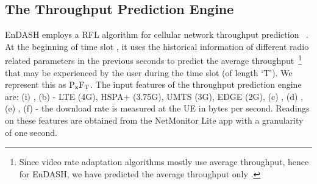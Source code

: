  \subsection{The Throughput Prediction Engine}\label{section:thpre}
EnDASH employs a \ac{RFL} algorithm for cellular network throughput prediction ~\cite{Raca2019}. At the beginning of time slot , it uses the historical information of different radio related parameters in the previous  seconds to predict the average throughput~\footnote{Since video rate adaptation algorithms mostly use average throughput, hence for EnDASH, we have predicted the average throughput only \cite{Raca2019}.} that may be experienced by the user during the time slot (of length `T'). We represent this as $\mathrm{P_{x}F_{T}}$. 
The input features of the throughput prediction engine are: (i) , (b)  - LTE (4G), HSPA+ (3.75G), UMTS (3G), EDGE (2G), (c) , (d) ,  (e) , (f)  - the download rate is measured at the \ac{UE} in bytes per second. Readings on these features  are obtained from the NetMonitor Lite app with a granularity of one second.\\
